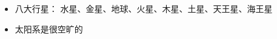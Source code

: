 
\begin{issues}
\issueDraft
\end{issues}

\begin{itemize}
\item 八大行星： 水星、金星、地球、火星、木星、土星、天王星、海王星
\item 太阳系是很空旷的
\end{itemize}
